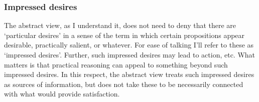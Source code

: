 \documentclass[10pt]{article}
\begin{document}
\subsubsection{Impressed desires}
\label{sec:impressions}

The abstract view, as I understand it, does not need to deny that there are `particular desires' in a sense of the term in which certain propositions appear desirable, practically salient, or whatever.
For ease of talking I'll refer to these as `impressed desires'.
Further, such impressed desires may lead to action, etc.
What matters is that practical reasoning can appeal to something beyond such impressed desires.
In this respect, the abstract view treats such impressed desires as sources of information, but does not take these to be necessarily connected with what would provide satisfaction.


\end{document}
